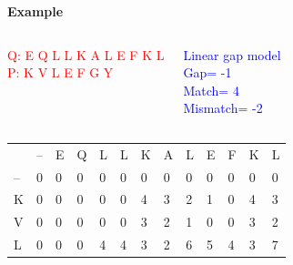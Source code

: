 \documentclass{bredelebeamer}
\begin{document}
\begin{frame}
\centering
  \begin{Large}
   \textbf{Example} \linebreak
  \end{Large}
\begin{columns}
\textcolor{red}{Q:  E Q L L K A L E F K L \\
P:  K V L E F G Y}

\textcolor{blue}{Linear gap model \\
Gap= -1 \\
Match= 4 \\
Mismatch= -2}

\end{columns}

\begin{table}[]
\centering
\begin{tabular}{lllllllllllll}
                        & --                     & E                      & Q                      & L                      & L                      & K                      & A                      & L                      & E                       & F                                               & K                       & L                       \\ \cline{2-13} 
\multicolumn{1}{l|}{--} & \multicolumn{1}{l|}{0} & \multicolumn{1}{l|}{0} & \multicolumn{1}{l|}{0} & \multicolumn{1}{l|}{0} & \multicolumn{1}{l|}{0} & \multicolumn{1}{l|}{0} & \multicolumn{1}{l|}{0} & \multicolumn{1}{l|}{0} & \multicolumn{1}{l|}{0}  & \multicolumn{1}{l|}{0}                          & \multicolumn{1}{l|}{0}  & \multicolumn{1}{l|}{0}  \\ \cline{2-13} 
\multicolumn{1}{l|}{K}  & \multicolumn{1}{l|}{0} & \multicolumn{1}{l|}{0} & \multicolumn{1}{l|}{0} & \multicolumn{1}{l|}{0} & \multicolumn{1}{l|}{0} & \multicolumn{1}{l|}{4} & \multicolumn{1}{l|}{3} & \multicolumn{1}{l|}{2} & \multicolumn{1}{l|}{1}  & \multicolumn{1}{l|}{0}                          & \multicolumn{1}{l|}{4}  & \multicolumn{1}{l|}{3}  \\ \cline{2-13} 
\multicolumn{1}{l|}{V}  & \multicolumn{1}{l|}{0} & \multicolumn{1}{l|}{0} & \multicolumn{1}{l|}{0} & \multicolumn{1}{l|}{0} & \multicolumn{1}{l|}{0} & \multicolumn{1}{l|}{3} & \multicolumn{1}{l|}{2} & \multicolumn{1}{l|}{1} & \multicolumn{1}{l|}{0}  & \multicolumn{1}{l|}{0}                          & \multicolumn{1}{l|}{3}  & \multicolumn{1}{l|}{2}  \\ \cline{2-13} 
\multicolumn{1}{l|}{L}  & \multicolumn{1}{l|}{0} & \multicolumn{1}{l|}{0} & \multicolumn{1}{l|}{0} & \multicolumn{1}{l|}{4} & \multicolumn{1}{l|}{4} & \multicolumn{1}{l|}{3} & \multicolumn{1}{l|}{2} & \multicolumn{1}{l|}{6} & \multicolumn{1}{l|}{5}  & \multicolumn{1}{l|}{4}                          & \multicolumn{1}{l|}{3}  & \multicolumn{1}{l|}{7}  \\ \cline{2-13} 

\end{tabular}
\end{table}
\end{frame}
\end{document}
